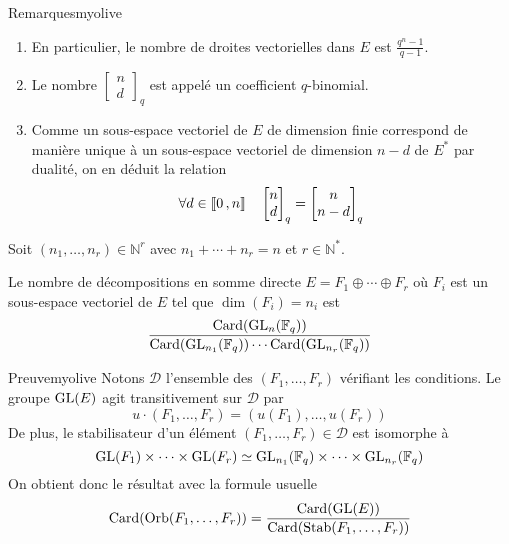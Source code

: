     \begin{omed}{Remarques}{myolive}
        \begin{enumerate}[label=\textcolor{myolive}{(\arabic*)}]
            \item En particulier, le nombre de droites vectorielles dans $E$ est $\frac{q^n - 1}{q - 1}$.
            \item Le nombre $\begin{bmatrix}
                n \\
                d
            \end{bmatrix}_q$ est appelé un coefficient $q$-binomial.
            \item Comme un sous-espace vectoriel de $E$ de dimension finie correspond de manière unique à un sous-espace vectoriel de dimension $n - d$ de $E^*$ par dualité, on en déduit la relation 
            \[ \forall d \in \left\llbracket 0 \, , n \right\rrbracket \quad \begin{bmatrix}
                n \\
                d
            \end{bmatrix}_q = \begin{bmatrix}
                n \\
                n-d
            \end{bmatrix}_q\]
        \end{enumerate} 
    \end{omed}

    \begin{prop}{}{}
        Soit $(n_1,\ldots,n_r) \in \mathbb{N}^r$ avec $n_1 + \cdots + n_r = n$ et $r \in \mathbb{N}^*$. 

        Le nombre de décompositions en somme directe $E = F_1 \oplus \cdots \oplus F_r$ où $F_i$ est un sous-espace vectoriel de $E$ tel que $\dim(F_i) = n_i$ est 
        \[ \frac{\operatorname{Card}(\operatorname{GL}_n(\mathbb{F}_q))}{\operatorname{Card}(\operatorname{GL}_{n_1}(\mathbb{F}_q)) \cdots \operatorname{Card}(\operatorname{GL}_{n_r}(\mathbb{F}_q))} \]
    \end{prop}

    \begin{demo}{Preuve}{myolive}
        Notons $\mathcal{D}$ l’ensemble des $(F_1,\ldots,F_r)$ vérifiant les conditions. Le groupe $\operatorname{GL}(E)$ agit transitivement sur $\mathcal{D}$ par 
        \[ u \cdotp (F_1,\ldots,F_r) = (u(F_1),\ldots,u(F_r)) \]   
        De plus, le stabilisateur d’un élément $(F_1,\ldots,F_r) \in \mathcal{D}$ est isomorphe à 
        \[ \operatorname{GL}(F_1) \times \cdots \times \operatorname{GL}(F_r) \simeq \operatorname{GL}_{n_1}(\mathbb{F}_q) \times \cdots \times \operatorname{GL}_{n_r}(\mathbb{F}_q) \]   
        On obtient donc le résultat avec la formule usuelle 
        \[ \operatorname{Card}(\operatorname{Orb}(F_1,\ldots,F_r)) = \frac{\operatorname{Card}(\operatorname{GL}(E))}{\operatorname{Card}(\operatorname{Stab}(F_1,\ldots,F_r))} \]
    \end{demo}
